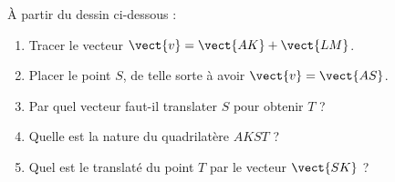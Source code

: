 
\begin{exercice}\label{exosmath-0683}

À partir du dessin ci-dessous :
    \begin{enumerate}
        \item
            Tracer le vecteur \( \vect{ v }=\vect{ AK }+\vect{ LM }\).
        \item
            Placer le point \( S\), de telle sorte à avoir \( \vect{ v }=\vect{ AS }\).
        \item
            Par quel vecteur faut-il translater \( S\) pour obtenir \( T\) ?
        \item
            Quelle est la nature du quadrilatère \( AKST\) ?
        \item
            Quel est le translaté du point \( T\) par le vecteur \( \vect{ SK }\) ?
    \end{enumerate}

    \begin{center}
   
    \end{center}

\end{exercice}
